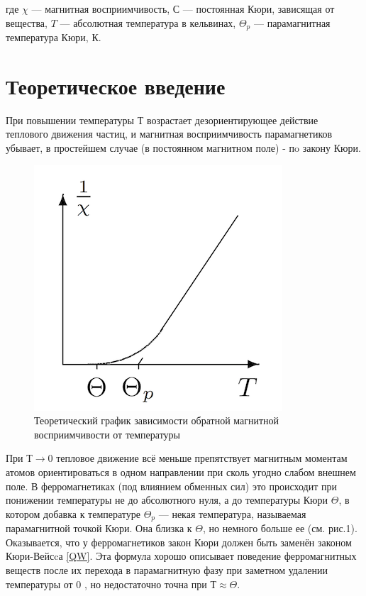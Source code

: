 \documentclass[12pt,a4paper]{article}
\begin{document}
где $ \chi  $ — магнитная восприимчивость, $ С $ — постоянная Кюри, зависящая от вещества, $ T $ — абсолютная температура в кельвинах, $ \Theta_p  $ — парамагнитная температура Кюри, К.

\section{Теоретическое введение}

При повышении температуры $ Т $ возрастает дезориентирующее действие теплового движения частиц, и магнитная восприимчивость парамагнетиков
убывает, в простейшем случае (в постоянном магнитном
поле) - пo закону Кюри.

\begin{figure} 
	\includegraphics{342teorgraph.png}
	\caption{Теоретический график зависимости обратной магнитной восприимчивости от температуры}
\end{figure}

При $ Т \to 0 $ тепловое движение всё меньше препятствует магнитным моментам атомов ориентироваться в одном направлении при сколь
угодно слабом внешнем поле. В ферромагнетиках (под влиянием обменных сил) это происходит при понижении температуры не до абсолютного
нуля, а до температуры Кюри $ \Theta $, в котором добавка к температуре $ \Theta_p $ --- некая температура, называемая парамагнитной точкой Кюри. Она близка к $ \Theta $, но немного больше ее (см. рис.1). Оказывается, что у ферромагнетиков закон Кюри должен быть заменён законом Кюри-Вейсcа \eqref{QW}. Эта формула хорошо описывает поведение ферромагнитных  веществ после их перехода в парамагнитную фазу при заметном удалении температуры от 0 , но недостаточно точна при $ Т \approx \Theta$.
\end{document}

